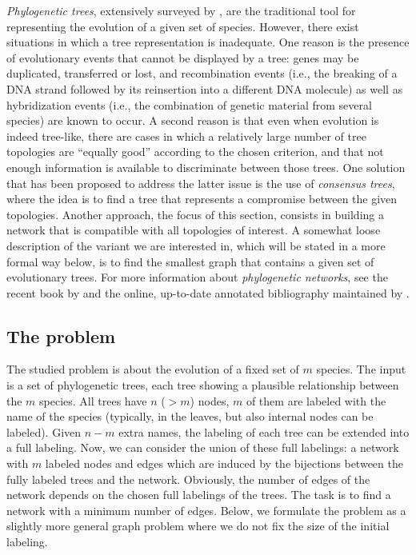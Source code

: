 \documentclass{tlp}
\renewcommand{\|}{\ensuremath{\,|\,}}
\renewcommand{\|}{\,|\,}
\begin{document}
\emph{Phylogenetic trees}, extensively surveyed by
, are the traditional tool for
representing the evolution of a given set of species.  However, there
exist situations in which a tree representation is inadequate. One
reason is the presence of evolutionary events that cannot be displayed
by a tree: genes may be duplicated, transferred or lost, and
recombination events (i.e., the breaking of a DNA strand followed by
its reinsertion into a different DNA molecule) as well as
hybridization events (i.e., the combination of genetic material from
several species) are known to occur. A second reason is that even when
evolution is indeed tree-like, there are cases in which a relatively
large number of tree topologies are ``equally good'' according to the
chosen criterion, and that not enough information is available to
discriminate between those trees. One solution that has been proposed
to address the latter issue is the use of \emph{consensus trees},
where the idea is to find a tree that represents a compromise between
the given topologies. Another approach, the focus of this section,
consists in building a network that is compatible with all topologies
of interest. A somewhat loose description of the variant we are
interested in, which will be stated in a more formal way below, is to
find the smallest graph that contains a given set of evolutionary
trees.  For more information about \emph{phylogenetic networks}, see
the recent book by  and the online,
up-to-date annotated bibliography maintained by .

\subsection{The problem}

The studied problem is about the evolution of a fixed set of $m$
species. The input is a set of phylogenetic trees, each tree showing a
plausible relationship between the $m$ species.  All trees have $n$
($>m$) nodes, $m$ of them are labeled with the name of the species
(typically, in the leaves, but also internal nodes can be
labeled). Given $n-m$ extra names, the labeling of each tree can be
extended into a full labeling. Now, we can consider the union of these
full labelings: a network with $m$ labeled nodes and edges which are
induced by the bijections between the fully labeled trees and the
network. Obviously, the number of edges of the network depends on the
chosen full labelings of the trees.  The task is to find a network
with a minimum number of edges.  Below, we formulate the problem as a
slightly more general graph problem where we do not fix the size of
the initial labeling.
\end{document}
